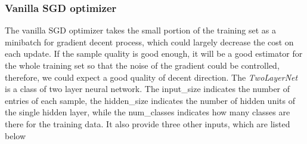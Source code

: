 \documentclass[11pt]{article}
\begin{document}
    \hypertarget{vanilla-sgd-optimizer}{%
\subsubsection{Vanilla SGD optimizer}\label{vanilla-sgd-optimizer}}

The vanilla SGD optimizer takes the small portion of the training set as
a minibatch for gradient decent process, which could largely decrease
the cost on each update. If the sample quality is good enough, it will
be a good estimator for the whole training set so that the noise of the
gradient could be controlled, therefore, we could expect a good quality
of decent direction. The \emph{TwoLayerNet} is a class of two layer
neural network. The input\_size indicates the number of entries of each
sample, the hidden\_size indicates the number of hidden units of the
single hidden layer, while the num\_classes indicates how many classes
are there for the training data. It also provide three other inputs,
which are listed below
\end{document}
